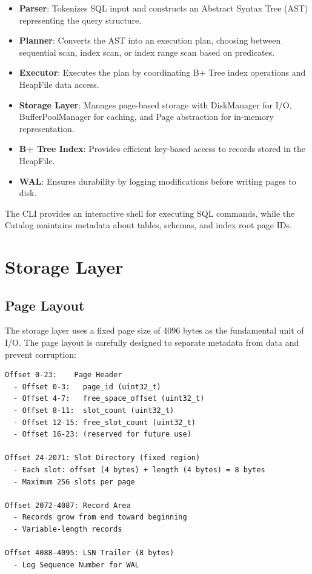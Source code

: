 \documentclass{article}
\begin{document}
\begin{itemize}
    \item \textbf{Parser}: Tokenizes SQL input and constructs an Abstract Syntax Tree (AST) representing the query structure.
    \item \textbf{Planner}: Converts the AST into an execution plan, choosing between sequential scan, index scan, or index range scan based on predicates.
    \item \textbf{Executor}: Executes the plan by coordinating B+ Tree index operations and HeapFile data access.
    \item \textbf{Storage Layer}: Manages page-based storage with DiskManager for I/O, BufferPoolManager for caching, and Page abstraction for in-memory representation.
    \item \textbf{B+ Tree Index}: Provides efficient key-based access to records stored in the HeapFile.
    \item \textbf{WAL}: Ensures durability by logging modifications before writing pages to disk.
\end{itemize}

The CLI provides an interactive shell for executing SQL commands, while the Catalog maintains metadata about tables, schemas, and index root page IDs.

\section{Storage Layer}

\subsection{Page Layout}

The storage layer uses a fixed page size of 4096 bytes as the fundamental unit of I/O. The page layout is carefully designed to separate metadata from data and prevent corruption:

\begin{verbatim}
Offset 0-23:    Page Header
  - Offset 0-3:   page_id (uint32_t)
  - Offset 4-7:   free_space_offset (uint32_t)
  - Offset 8-11:  slot_count (uint32_t)
  - Offset 12-15: free_slot_count (uint32_t)
  - Offset 16-23: (reserved for future use)

Offset 24-2071: Slot Directory (fixed region)
  - Each slot: offset (4 bytes) + length (4 bytes) = 8 bytes
  - Maximum 256 slots per page

Offset 2072-4087: Record Area
  - Records grow from end toward beginning
  - Variable-length records

Offset 4088-4095: LSN Trailer (8 bytes)
  - Log Sequence Number for WAL
\end{verbatim}
\end{document}

